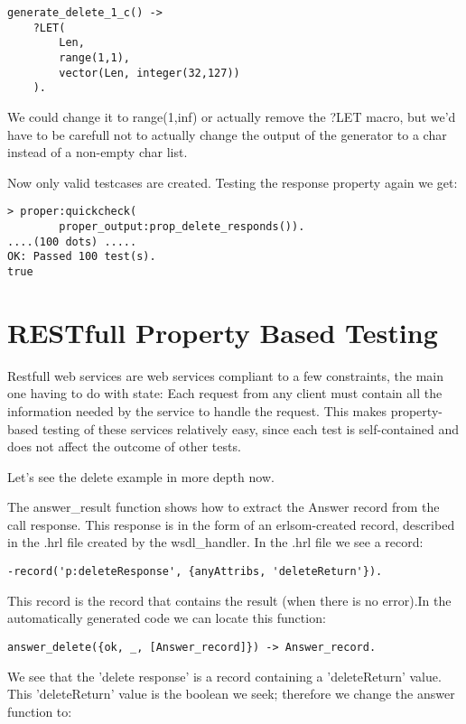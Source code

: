 \documentclass[11pt]{article} %
\begin{document}
\begin{lstlisting}
generate_delete_1_c() -> 
	?LET(
		Len, 
		range(1,1), 
		vector(Len, integer(32,127))
	).
\end{lstlisting}
We could change it to range(1,inf) or actually remove the ?LET macro, but we'd have to be carefull not to actually change the output of the generator to a char instead of a non-empty char list.

Now only valid testcases are created. Testing the response property again we get:
\begin{lstlisting}
> proper:quickcheck(
        proper_output:prop_delete_responds()).
....(100 dots) .....
OK: Passed 100 test(s).
true
\end{lstlisting}

\section{RESTfull Property Based Testing}

Restfull web services are web services compliant to a few constraints, the main one having to do with state: Each request from any client must contain all the information needed by the service to handle the request. This makes property-based testing of these services relatively easy, since each test is self-contained and does not affect the outcome of other tests. 

Let's see the delete example in more depth now. 

The answer\_result function shows how to extract the Answer record from the call response. This response is in the form of an erlsom-created record, described in the .hrl file created by the wsdl\_handler. In the .hrl file we see a record: 
\begin{lstlisting}
-record('p:deleteResponse', {anyAttribs, 'deleteReturn'}).
\end{lstlisting}

This record is the record that contains the result (when there is no error).In the automatically generated code we can locate this function:

\begin{lstlisting}
answer_delete({ok, _, [Answer_record]}) -> Answer_record.
\end{lstlisting}

We see that the 'delete response' is a record containing a 'deleteReturn' value. This 'deleteReturn' value is the boolean we seek; therefore we change the answer function to:
\end{document}
